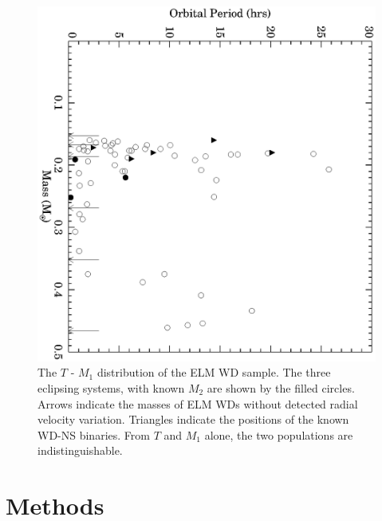 \documentclass[apjl]{emulateapj}
\newcommand{\period}{T}
\begin{document}
\begin{figure}[h!]
\begin{center}
\includegraphics[angle=90,width=0.95\columnwidth]{Porb_M1.eps}
\caption{The $\period$ - $M_1$ distribution of the ELM WD sample. The three eclipsing systems, with known $M_2$ are shown by the filled circles. Arrows indicate the masses of ELM WDs without detected radial velocity variation. Triangles indicate the positions of the known WD-NS binaries. From $\period$ and $M_1$ alone, the two populations are indistinguishable.}
\label{fig:Porb-M1}
\end{center}
\end{figure}




\section{Methods}
\end{document}
